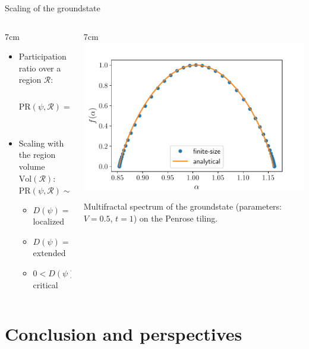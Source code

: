 \documentclass[xcolor=x11names,compress,professionalfonts, aspectratio=169]{beamer}
\renewcommand{\(}{\begin{columns}}
\renewcommand{\)}{\end{columns}}
\newcommand{\<}[1]{\begin{column}{#1}}
\renewcommand{\>}{\end{column}}
\begin{document}
\begin{frame}{Scaling of the groundstate}

\begin{columns}
\<{7cm}
\begin{itemize}
	\item Participation ratio over a region $\mathcal{R}$:
	\[
		\text{PR}(\psi, \mathcal{R}) = \frac{\left( \sum_{m \in \mathcal{R}}|\psi_m|^2 \right)^2}{\left( \sum_{m\in \mathcal{R}} |\psi_m|^4 \right)^4}
	\]
	\item Scaling with the region volume $\text{Vol}(\mathcal{R})$:
	\[
		\text{PR}(\psi, \mathcal{R}) \sim \text{Vol}(\mathcal{R})^{D(\psi)}
	\]
	\begin{itemize}
		\item $D(\psi) = 0 \implies \psi$ localized
		\item $D(\psi) = 1 \implies \psi$ extended
		\item $0 < D(\psi) < 1 \implies \psi$ critical
 	\end{itemize}
\end{itemize}
\>

\<{7cm}
\centering
\includegraphics[scale=.5]{img/multifractal_spectrum_Penrose_V_m0p5.pdf}
%


Multifractal spectrum of the groundstate (parameters: $V=0.5$, $t=1$) on the Penrose tiling.
\>
\end{columns}
\end{frame}

\section{Conclusion and perspectives}
\end{document}
